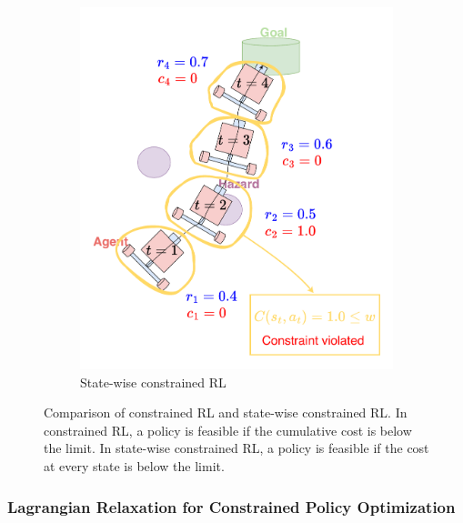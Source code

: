 \begin{figure}[H]
\begin{subfigure}{0.48\textwidth}
        \includegraphics[width=\linewidth]{figure/statewise-constrained-rl.pdf}
        \caption{State-wise constrained RL}
    \end{subfigure}
    \caption{Comparison of constrained RL and state-wise constrained RL.
            In constrained RL, a policy is feasible if the cumulative cost is below the limit.
            In state-wise constrained RL, a policy is feasible if the cost at every state is below the limit.}
    \label{fig:constrained_rl_vs_statewise_constrained_rl}
\end{figure}



\subsubsection{Lagrangian Relaxation for Constrained Policy Optimization} \label{subsubsec:lagrangian_relaxation}


